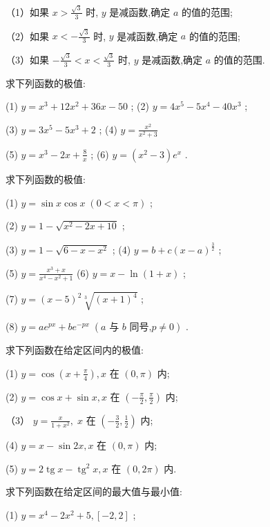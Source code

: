\documentclass[lang=cn,newtx,12pt,scheme=chinese]{elegantbook}
\begin{document}
\begin{problemset}[习 题 十 一]
（1）如果 \(x > \frac{\sqrt{3}}{3}\) 时, \(y\) 是减函数,确定 \(a\) 的值的范围;

（2）如果 \(x < - \frac{\sqrt{3}}{3}\) 时, \(y\) 是减函数,确定 \(a\) 的值的范围;

（3）如果 \(- \frac{\sqrt{3}}{3} < x < \frac{\sqrt{3}}{3}\) 时, \(y\) 是减函数,确定 \(a\) 的值的范围.

\item 求下列函数的极值:

(1) \(y = {x}^{3} + {12}{x}^{2} + {36x} - {50}\) ; (2) \(y = 4{x}^{5} - 5{x}^{4} - {40}{x}^{3}\) ;

(3) \(y = 3{x}^{5} - 5{x}^{3} + 2\) ; (4) \(y = \frac{{x}^{2}}{{x}^{2} + 3}\)

(5) \(y = {x}^{3} - {2x} + \frac{8}{x}\) ; (6) \(y = \left( {{x}^{2} - 3}\right) {e}^{x}\) .

\item 求下列函数的极值:

(1) \(y = \sin x\cos x\;\left( {0 < x < \pi }\right)\) ;

(2) \(y = 1 - \sqrt{{x}^{2} - {2x} + {10}}\) ;

(3) \(y = 1 - \sqrt{6 - x - {x}^{2}}\) ; (4) \(y = b + c{\left( x - a\right) }^{\frac{3}{2}}\) ;

(5) \(y = \frac{{x}^{3} + x}{{x}^{4} - {x}^{2} + 1}\) (6) \(y = x - \ln \left( {1 + x}\right)\) ;

(7) \(y = {\left( x - 5\right) }^{2}\sqrt[3]{{\left( x + 1\right) }^{4}}\) ;

(8) \(y = a{e}^{px} + b{e}^{-{px}}\;\left( {a\text{ 与 }b\text{ 同号,}p \neq 0}\right)\) .

\item 求下列函数在给定区间内的极值:

(1) \(y = \cos \left( {x + \frac{\pi }{4}}\right) ,x\) 在 \(\left( {0,\pi }\right)\) 内;

(2) \(y = \cos x + \sin x,x\) 在 \(\left( {-\frac{\pi }{2},\frac{\pi }{2}}\right)\) 内;

（3） \(y = \frac{x}{1 + {x}^{2}},\;x\) 在 \(\left( {-\frac{3}{2},\frac{1}{2}}\right)\) 内;

(4) \(y = x - \sin {2x},x\) 在 \(\left( {0,\pi }\right)\) 内;

(5) \(y = 2\operatorname{tg}x - {\operatorname{tg}}^{2}x,x\) 在 \(\left( {0,{2\pi }}\right)\) 内.

\item 求下列函数在给定区间的最大值与最小值:

(1) \(y = {x}^{4} - 2{x}^{2} + 5,\left\lbrack {-2,2}\right\rbrack\) ;


\end{problemset}
\end{document}
